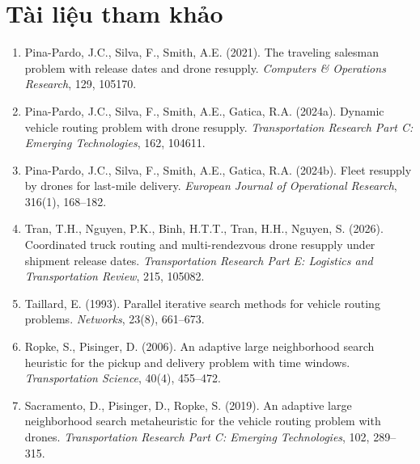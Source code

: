 \documentclass[12pt,a4paper]{article}
\begin{document}
\section*{Tài liệu tham khảo}

\begin{enumerate}
    \item Pina-Pardo, J.C., Silva, F., Smith, A.E. (2021). The traveling salesman
    problem with release dates and drone resupply. \emph{Computers \& Operations
    Research}, 129, 105170.
    \item Pina-Pardo, J.C., Silva, F., Smith, A.E., Gatica, R.A. (2024a). Dynamic
    vehicle routing problem with drone resupply. \emph{Transportation Research Part
    C: Emerging Technologies}, 162, 104611.
    \item Pina-Pardo, J.C., Silva, F., Smith, A.E., Gatica, R.A. (2024b). Fleet
    resupply by drones for last-mile delivery. \emph{European Journal of Operational
    Research}, 316(1), 168--182.
    \item Tran, T.H., Nguyen, P.K., Binh, H.T.T., Tran, H.H., Nguyen, S. (2026).
    Coordinated truck routing and multi-rendezvous drone resupply under shipment
    release dates. \emph{Transportation Research Part E: Logistics and
    Transportation Review}, 215, 105082.
    \item Taillard, E. (1993). Parallel iterative search methods for vehicle routing
    problems. \emph{Networks}, 23(8), 661--673.
    \item Ropke, S., Pisinger, D. (2006). An adaptive large neighborhood search
    heuristic for the pickup and delivery problem with time windows.
    \emph{Transportation Science}, 40(4), 455--472.
    \item Sacramento, D., Pisinger, D., Ropke, S. (2019). An adaptive large
    neighborhood search metaheuristic for the vehicle routing problem with drones.
    \emph{Transportation Research Part C: Emerging Technologies}, 102, 289--315.
\end{enumerate}
\end{document}

